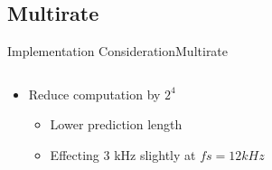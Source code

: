 \subsection{Multirate}
\begin{frame}{Implementation Consideration}{Multirate}

	\begin{columns}
		\begin{column}{0.4\textwidth}
\begin{itemize}
\item Reduce computation by $2^4$

\begin{itemize}
\item Lower prediction length
\item Effecting 3 kHz slightly at $fs=12 kHz$ 
\end{itemize}
\end{itemize}
		\end{column}
		\begin{column}{0.6\textwidth} 
		

\end{column}
\end{columns}
\end{frame}

